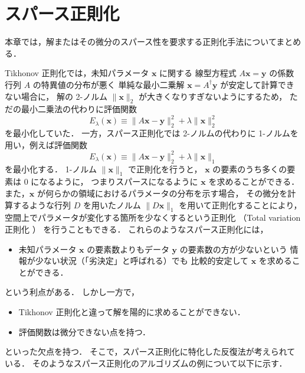 %

\chapter{スパース正則化}\label{chap:regularization_sparse}

本章では，解またはその微分のスパース性を要求する正則化手法についてまとめる．

Tikhonov 正則化では，未知パラメータ $\bm{x}$ に関する
線型方程式 $A \bm{x} = \bm{y}$ の係数行列 $A$ の特異値の分布が悪く
単純な最小二乗解 $\bm{x} = A^\dagger \bm{y}$ が安定して計算できない場合に，
解の 2-ノルム $\|\bm{x}\|_2$ が大きくなりすぎないようにするため，
ただの最小二乗法の代わりに評価関数
\begin{equation}
    E_{\lambda}(\bm{x}) \equiv \|A \bm{x} - \bm{y}\|_2^2 + \lambda \|\bm{x}\|_2^2
\end{equation}
を最小化していた．
一方，スパース正則化では 2-ノルムの代わりに 1-ノルムを用い，例えば評価関数
\begin{equation}
    E_{\lambda}(\bm{x}) \equiv \|A \bm{x} - \bm{y}\|_2^2 + \lambda \|\bm{x}\|_1
\end{equation}
を最小化する．
1-ノルム $\|\bm{x}\|_1$ で正則化を行うと，
$\bm{x}$ の要素のうち多くの要素は 0 になるように，
つまりスパースになるように $\bm{x}$ を求めることができる．
また，$\bm{x}$ が何らかの領域におけるパラメータの分布を示す場合，
その微分を計算するような行列 $D$ を用いたノルム $\|D \bm{x}\|_1$ を用いて正則化することにより，
空間上でパラメータが変化する箇所を少なくするという正則化
（Total variation 正則化
）
を行うこともできる．
これらのようなスパース正則化には，
\begin{itemize}
    \item 未知パラメータ $\bm{x}$ の要素数よりもデータ $\bm{y}$ の要素数の方が少ないという
          情報が少ない状況（「劣決定」と呼ばれる）でも
          比較的安定して $\bm{x}$ を求めることができる．
\end{itemize}
という利点がある．
しかし一方で，
\begin{itemize}
    \item Tikhonov 正則化と違って解を陽的に求めることができない．
    \item 評価関数は微分できない点を持つ．
\end{itemize}
といった欠点を持つ．
そこで，スパース正則化に特化した反復法が考えられている．
そのようなスパース正則化のアルゴリズムの例について以下に示す．




